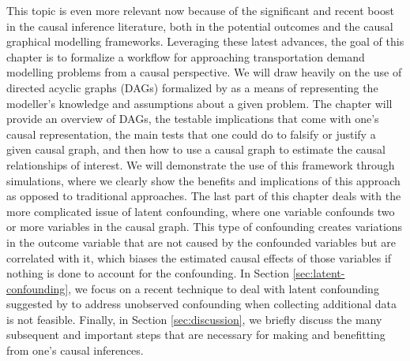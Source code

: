 This topic is even more relevant now because of the significant and recent boost in the causal inference literature, both in the potential outcomes and the causal graphical modelling frameworks.
Leveraging these latest advances, the goal of this chapter is to formalize a workflow for approaching
transportation demand modelling problems from a causal perspective.
We will draw heavily on the use of directed acyclic graphs (DAGs) formalized by \citet{pearl_causality_2000} as a means of representing the modeller's knowledge and assumptions about a given problem.
The chapter will provide an overview of DAGs, the
testable implications that come with one's causal representation, the main
tests that one could do to falsify or justify a given causal graph, and then how
to use a causal graph to estimate the causal relationships of interest.
We will demonstrate the use of this framework through simulations, where we
clearly show the benefits and implications of this approach as opposed to
traditional approaches.
The last part of this chapter deals with the more complicated issue of latent
confounding, where one variable confounds two or more variables in the causal
graph. This type of confounding creates variations in the outcome variable that are not caused by
the confounded variables but are correlated with it, which biases the estimated
causal effects of those variables if nothing is done to account for the
confounding.
In Section \ref{sec:latent-confounding}, we focus on a recent technique to deal with latent confounding suggested by \citet{wang_2019_blessings} to address unobserved confounding when collecting additional data is not feasible.
Finally, in Section \ref{sec:discussion}, we briefly discuss the many subsequent and important steps that are necessary for making and benefitting from one's causal inferences.
